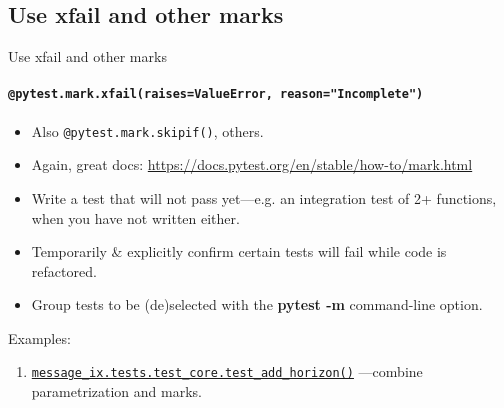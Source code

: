 \documentclass[12pt,aspectratio=169]{beamer}
\newcommand{\func}[1]{\texttt{#1()}}
\begin{document}
\subsection{Use xfail and other marks}
\begin{frame}{Use xfail and other marks}
\framesubtitle{\texttt{@pytest.mark.xfail(raises=ValueError, reason="Incomplete")}}

\begin{itemize}
  \item Also \texttt{@pytest.mark.skipif()}, others.
  \item Again, great docs: \url{https://docs.pytest.org/en/stable/how-to/mark.html}
  \item Write a test that will not pass yet—e.g. an integration test of 2+ functions, when you have not written either.
  \item Temporarily \& explicitly confirm certain tests will fail while code is refactored.
  \item Group tests to be (de)selected with the \textbf{pytest -m} command-line option.
\end{itemize}

\bigskip
Examples:
\begin{enumerate}
\item \href{https://github.com/iiasa/message_ix/blob/a488b8a/message_ix/tests/test_core.py\#L112-L186}{\func{message_ix.tests.test_core.test_add_horizon}} —combine parametrization and marks.
\end{enumerate}
\end{frame}
\end{document}
